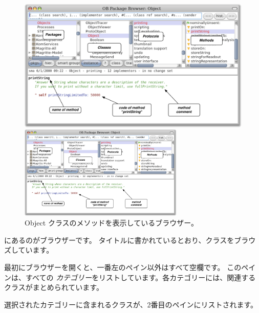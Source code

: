 \documentclass[a4paper,10pt,twoside]{book}
\begin{document}

\begin{figure}[htb]
\ifluluelse
	{\centerline {\includegraphics[width=\textwidth]{ClassBrowser1}}}
	{\centerline {\includegraphics[width=0.7\textwidth]{ClassBrowser1}}}
\caption{Object クラスのメソッドを表示しているブラウザー。
}
\end{figure}

にあるのがブラウザーです。
タイトルに書かれているとおり、クラスをブラウズしています。

最初にブラウザーを開くと、一番左のペイン以外はすべて空欄です。
このペインは、すべての \emph{カテゴリー}をリストしています。各カテゴリーには、関連するクラスがまとめられています。

選択されたカテゴリーに含まれるクラスが、2番目のペインにリストされます。
\end{document}
